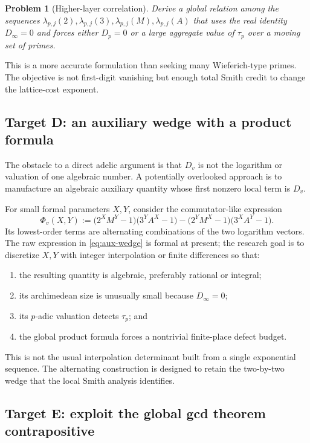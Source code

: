 \documentclass[11pt,oneside]{article}
\newtheorem{problem}[theorem]{Problem}
\theoremstyle{definition}
\begin{document}
\begin{problem}[Higher-layer correlation]
Derive a global relation among the sequences
$\lambda_{p,j}(2),\lambda_{p,j}(3),\lambda_{p,j}(M),\lambda_{p,j}(A)$ that
uses the real identity $D_\infty=0$ and forces either $D_p=0$ or a large
aggregate value of $\tau_p$ over a moving set of primes.
\end{problem}

This is a more accurate formulation than seeking many Wieferich-type
primes.  The objective is not first-digit vanishing but enough total
Smith credit to change the lattice-cost exponent.

\subsection{Target D: an auxiliary wedge with a product formula}

The obstacle to a direct adelic argument is that $D_v$ is not the
logarithm or valuation of one algebraic number.  A potentially overlooked
approach is to manufacture an algebraic auxiliary quantity whose first
nonzero local term is $D_v$.

For small formal parameters $X,Y$, consider the commutator-like expression
\begin{equation}\label{eq:aux-wedge}
  \Phi_v(X,Y)
  :=\bigl(2^X M^Y-1\bigr)\bigl(3^Y A^X-1\bigr)
   -\bigl(2^Y M^X-1\bigr)\bigl(3^X A^Y-1\bigr).
\end{equation}
Its lowest-order terms are alternating combinations of the two logarithm
vectors.  The raw expression in \eqref{eq:aux-wedge} is formal at present;
the research goal is to discretize $X,Y$ with integer interpolation or
finite differences so that:
\begin{enumerate}
  \item the resulting quantity is algebraic, preferably rational or
        integral;
  \item its archimedean size is unusually small because $D_\infty=0$;
  \item its $p$-adic valuation detects $\tau_p$; and
  \item the global product formula forces a nontrivial finite-place defect
        budget.
\end{enumerate}
This is not the usual interpolation determinant built from a single
exponential sequence.  The alternating construction is designed to
retain the two-by-two wedge that the local Smith analysis identifies.

\subsection{Target E: exploit the global gcd theorem contrapositive}
\end{document}
